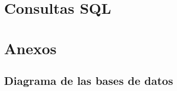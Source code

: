 \documentclass[12pt,letterpaper]{article}
\begin{document}
\section{Consultas SQL}

\section{Anexos}

\subsection{Diagrama de las bases de datos}


\centering

\end{document}
